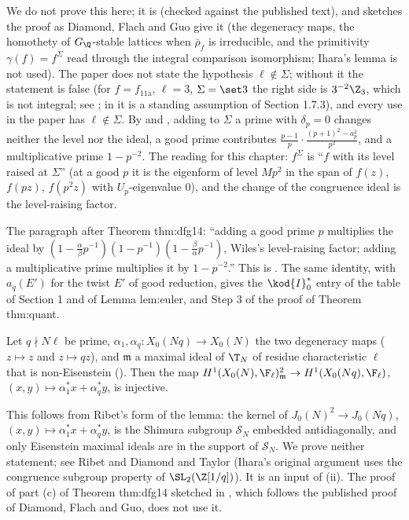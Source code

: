 We do not prove this here; it is \cite[Proposition 1.4(c)]{DFG04} (checked against the published text), and  sketches the proof as Diamond, Flach and Guo give it
(the degeneracy maps, the homothety of $G_\Q$-stable lattices when $\bar\rho_f$ is irreducible, and the primitivity $\gamma(f)=f^\Sigma$ read through the integral comparison isomorphism; Ihara's
lemma is not used). The paper does not state the hypothesis
$\ell\notin\Sigma$; without it the statement is false (for $f=f_{\text{11a}}$, $\ell=3$, $\Sigma=\set3$ the right side is $3^{-2}\Z_3$, which is not integral; see ; in \cite{DFG04} it is a standing assumption of Section 1.7.3), and
every use in the paper has $\ell\notin\Sigma$. By  and , adding to $\Sigma$ a prime with $\delta_p=0$ changes neither the level nor
the ideal, a good prime contributes $\frac{p-1}p\cdot\frac{(p+1)^2-a_p^2}{p^2}$, and a multiplicative prime $1-p^{-2}$. The reading for this chapter: $f^\Sigma$ is ``$f$ with its level
raised at $\Sigma$'' (at a good $p$ it is the eigenform of level $Mp^2$ in the span of $f(z)$, $f(pz)$, $f(p^2z)$ with $U_p$-eigenvalue $0$), and the change of the
congruence ideal is the level-raising factor.

\begin{paperlink}
The paragraph after Theorem thm:dfg14: ``adding a good prime $p$ multiplies the ideal by $(1-\frac\alpha\beta p^{-1})(1-p^{-1})(1-\frac\beta\alpha p^{-1})$, Wiles's level-raising
factor; adding a multiplicative prime multiplies it by $1-p^{-2}$.'' This is . The same identity, with $a_q(E')$ for the
twist $E'$ of good reduction, gives the $\kod{I}_0^*$ entry of the table of Section 1 and of Lemma lem:euler, and Step 3 of the proof of Theorem thm:quant.
\end{paperlink}

\begin{lemma}\label{lem:modgalrep:ihara}
Let $q\nmid N\ell$ be prime, $\alpha_1,\alpha_q\colon X_0(Nq)\to X_0(N)$ the two degeneracy maps ($z\mapsto z$ and $z\mapsto qz$), and $\mathfrak m$ a maximal ideal of $\T_N$ of residue
characteristic $\ell$ that is non-Eisenstein (). Then the map $H^1(X_0(N),\F_\ell)^2_{\mathfrak m}\to H^1(X_0(Nq),\F_\ell)$, $(x,y)\mapsto\alpha_1^*x+\alpha_q^*y$, is
injective.
\end{lemma}

This follows from Ribet's form of the lemma: the kernel of $J_0(N)^2\to J_0(Nq)$, $(x,y)\mapsto\alpha_1^*x+\alpha_q^*y$, is the Shimura subgroup $\mathcal S_N$ embedded
antidiagonally, and only Eisenstein maximal ideals are in the support of $\mathcal S_N$. We prove neither statement; see Ribet \cite{Ribet84} and Diamond and Taylor \cite{DiamondTaylor94} (Ihara's original argument uses the congruence
subgroup property of $\SL_2(\Z[1/q])$). It is an input of (ii). The proof of part (c) of Theorem thm:dfg14 sketched in , which follows the published proof of
Diamond, Flach and Guo, does not use it.

